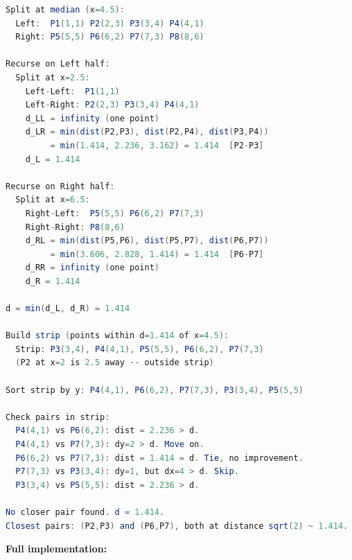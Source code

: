 \begin{lstlisting}[language=Java]
Split at median (x=4.5):
  Left:  P1(1,1) P2(2,3) P3(3,4) P4(4,1)
  Right: P5(5,5) P6(6,2) P7(7,3) P8(8,6)

Recurse on Left half:
  Split at x=2.5:
    Left-Left:  P1(1,1)
    Left-Right: P2(2,3) P3(3,4) P4(4,1)
    d_LL = infinity (one point)
    d_LR = min(dist(P2,P3), dist(P2,P4), dist(P3,P4))
         = min(1.414, 2.236, 3.162) = 1.414  [P2-P3]
    d_L = 1.414

Recurse on Right half:
  Split at x=6.5:
    Right-Left:  P5(5,5) P6(6,2) P7(7,3)
    Right-Right: P8(8,6)
    d_RL = min(dist(P5,P6), dist(P5,P7), dist(P6,P7))
         = min(3.606, 2.828, 1.414) = 1.414  [P6-P7]
    d_RR = infinity (one point)
    d_R = 1.414

d = min(d_L, d_R) = 1.414

Build strip (points within d=1.414 of x=4.5):
  Strip: P3(3,4), P4(4,1), P5(5,5), P6(6,2), P7(7,3)
  (P2 at x=2 is 2.5 away -- outside strip)

Sort strip by y: P4(4,1), P6(6,2), P7(7,3), P3(3,4), P5(5,5)

Check pairs in strip:
  P4(4,1) vs P6(6,2): dist = 2.236 > d.
  P4(4,1) vs P7(7,3): dy=2 > d. Move on.
  P6(6,2) vs P7(7,3): dist = 1.414 = d. Tie, no improvement.
  P7(7,3) vs P3(3,4): dy=1, but dx=4 > d. Skip.
  P3(3,4) vs P5(5,5): dist = 2.236 > d.

No closer pair found. d = 1.414.
Closest pairs: (P2,P3) and (P6,P7), both at distance sqrt(2) ~ 1.414.
\end{lstlisting}

\textbf{Full implementation:}

